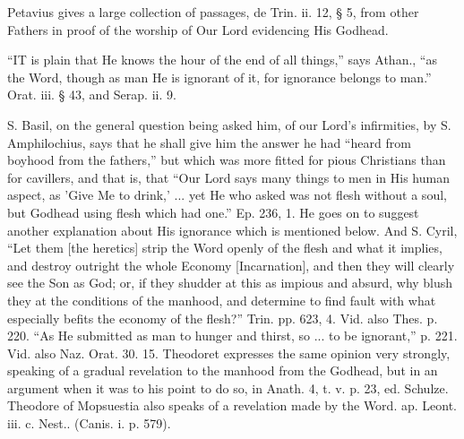 Petavius gives a large collection of passages, de
Trin. ii. 12, § 5, from other Fathers in proof of the worship of Our
Lord evidencing His Godhead.


``IT
is plain that He knows the hour of the end of all things,'' says Athan.,
``as the Word, though as man He is ignorant of it, for
ignorance belongs to man.'' Orat. iii. § 43, and Serap. ii. 9.

S. Basil, on the general question being asked
him, of our Lord's infirmities, by S. Amphilochius, says that he
shall give him the answer he had ``heard from boyhood from the
fathers,'' but which was more fitted for pious Christians than for
cavillers, and that is, that ``Our Lord says many things to men in
His human aspect, as 'Give Me to drink,' ... yet He who asked was not
flesh without a soul, but Godhead using flesh which had one.'' Ep.
236, 1. He goes on to suggest another explanation about His ignorance
which is mentioned below. And S. Cyril, ``Let them [the heretics]
strip the Word openly of the flesh and what it implies, and destroy
outright the whole Economy [Incarnation], and then they will clearly
see the Son as God; or, if they shudder at this as impious and absurd,
why blush they at the conditions of the manhood, and determine to find
fault with what especially befits the economy of the flesh?'' Trin.
pp. 623, 4. Vid. also Thes. p. 220. ``As He submitted as man to
hunger and thirst, so ... to be ignorant,'' p. 221. Vid. also Naz.
Orat. 30. 15. Theodoret expresses the same opinion very
strongly, speaking of a gradual revelation to the manhood from the
Godhead, but in an argument when it was to his point to do so, in
Anath. 4, t. v. p. 23, ed. Schulze. Theodore of Mopsuestia also speaks
of a revelation made by the Word. ap. Leont. iii. c. Nest.. (Canis. i.
p. 579).

